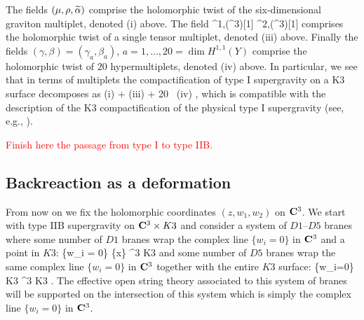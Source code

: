 \documentclass[../main.tex]{subfiles}
\begin{document}
The fields $(\mu,\rho, \widetilde \alpha)$ comprise the holomorphic twist of the six-dimensional graviton multiplet, denoted (i) above.
The field 
\beqn
\alpha \in \PV^{1,\bu}(\C^3)[1] \cap \ker \div \simeq \Omega^{2,\bu}(\C^3)[1] \cap \ker \del
\eeqn
comprises the holomorphic twist of a single tensor multiplet, denoted (iii) above.
Finally the fields $(\gamma, \beta) = (\gamma_a,\beta_a)$, $a=1,\ldots,20 = \dim H^{1,1}(Y)$ comprise the holomorphic twist of $20$ hypermultiplets, denoted (iv) above.
In particular, we see that in terms of multiplets the compactification of type I supergravity on a K3 surface decomposes as
\beqn
{} \rightsquigarrow (i) + (iii) + 20 \, (iv) ,
\eeqn
which is compatible with the description of the K3 compactification of the physical type I supergravity (see, e.g., \cite{Oz:1999it}).

\textcolor{red}{Finish here the passage from type I to type IIB.}

\subsection{Backreaction as a deformation} 
\label{sec:conifold}

From now on we fix the holomorphic coordinates $(z,w_1,w_2)$ on $\mathbf{C}^3$.
We start with type IIB supergravity on $\mathbf{C}^3 \times K3$ and consider a system of $D1$--$D5$ branes where some number of $D1$ branes wrap the complex line $\{w_i=0\}$ in $\mathbf{C}^3$ and a point in $K3$:
\beqn
\{w_i = 0\} \times \{x\} \subset \C^3 \times K3 
\eeqn
and some number of $D5$ branes wrap the same complex line $\{w_i=0\}$ in $\mathbf{C}^3$ together with the entire $K3$ surface:
\beqn
\{w_i=0\} \times K3 \subset \C^3 \times K3 .
\eeqn
The effective open string theory associated to this system of branes will be supported on the intersection of this system which is simply the complex line $\{w_i=0\}$ in $\mathbf{C}^3$.
\end{document}
